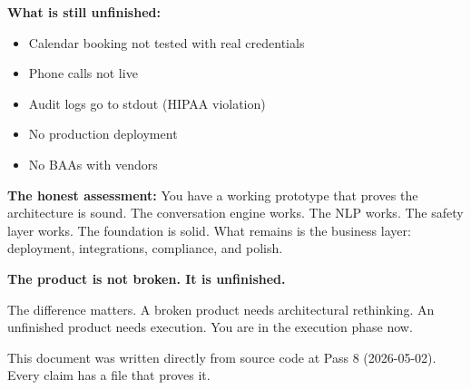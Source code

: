 \documentclass[12pt, a4paper]{report}
\begin{document}
\textbf{What is still unfinished:}
\begin{itemize}
  \item Calendar booking not tested with real credentials
  \item Phone calls not live
  \item Audit logs go to stdout (HIPAA violation)
  \item No production deployment
  \item No BAAs with vendors
\end{itemize}

\bigskip

\begin{quotebox}
  \large
  \textbf{The honest assessment:} You have a working prototype that proves the
  architecture is sound. The conversation engine works. The NLP works. The safety layer
  works. The foundation is solid. What remains is the business layer: deployment,
  integrations, compliance, and polish.

  \medskip
  \textbf{The product is not broken. It is unfinished.}

  \medskip
  The difference matters. A broken product needs architectural rethinking. An unfinished
  product needs execution. You are in the execution phase now.
\end{quotebox}

\vfill
{\color{mutedgray}\footnotesize This document was written directly from source code at
Pass 8 (2026-05-02). Every claim has a file that proves it.}
\end{document}
